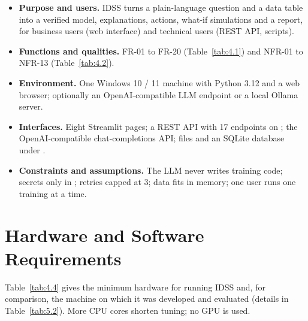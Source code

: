 \begin{itemize}
  \item \textbf{Purpose and users.} IDSS turns a plain-language question and a data table into a verified model, explanations, actions, what-if simulations and a report, for business users (web interface) and technical users (REST API, scripts).
  \item \textbf{Functions and qualities.} FR-01 to FR-20 (Table~\ref{tab:4.1}) and NFR-01 to NFR-13 (Table~\ref{tab:4.2}).
  \item \textbf{Environment.} One Windows 10 / 11 machine with Python 3.12 and a web browser; optionally an OpenAI-compatible LLM endpoint or a local Ollama server.
  \item \textbf{Interfaces.} Eight Streamlit pages; a REST API with 17 endpoints on ; the OpenAI-compatible chat-completions API; files and an SQLite database under .
  \item \textbf{Constraints and assumptions.} The LLM never writes training code; secrets only in ; retries capped at 3; data fits in memory; one user runs one training at a time.
\end{itemize}

\FloatBarrier
\section{Hardware and Software Requirements}\label{sec:4.2}

Table~\ref{tab:4.4} gives the minimum hardware for running IDSS and, for comparison, the machine on which it was developed and evaluated (details in Table~\ref{tab:5.2}). More CPU cores shorten tuning; no GPU is used.

